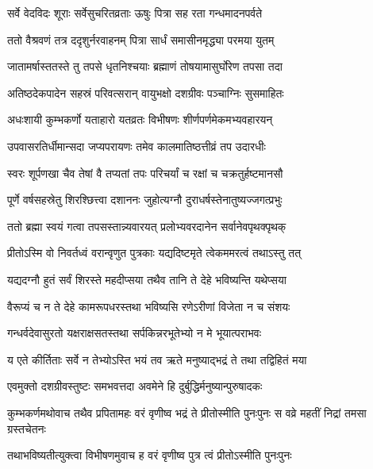 \twolineshloka
{सर्वे वेदविदः शूराः सर्वेसुचरितव्रताः}
{ऊषुः पित्रा सह रता गन्धमादनपर्वते}


\twolineshloka
{ततो वैश्रवणं तत्र ददृशुर्नरवाहनम्}
{पित्रा सार्धं समासीनमृद्ध्या परमया युतम्}


\twolineshloka
{जातामर्षास्ततस्ते तु तपसे धृतनिश्चयाः}
{ब्रह्माणं तोषयामासुर्घोरेण तपसा तदा}


\twolineshloka
{अतिष्ठदेकपादेन सहस्रं परिवत्सरान्}
{वायुभक्षो दशग्रीवः पञ्चाग्निः सुसमाहितः}


\twolineshloka
{अधःशायी कुम्भकर्णो यताहारो यतव्रतः}
{विभीषणः शीर्णपर्णमेकमभ्यवहारयन्}


\twolineshloka
{उपवासरतिर्धीमान्सदा जप्यपरायणः}
{तमेव कालमातिष्ठत्तीव्रं तप उदारधीः}


\twolineshloka
{स्वरः शूर्पणखा चैव तेषां वै तप्यतां तपः}
{परिचर्यां च रक्षां च चक्रतुर्हष्टमानसौ}


\twolineshloka
{पूर्णे वर्षसहस्रेतु शिरश्छित्त्वा दशाननः}
{जुहोत्यग्नौ दुराधर्षस्तेनातुष्यज्जगत्प्रभुः}


\twolineshloka
{ततो ब्रह्मा स्वयं गत्वा तपसस्तान्न्यवारयत्}
{प्रलोभ्यवरदानेन सर्वानेवपृथक्पृथक्}



\twolineshloka
{प्रीतोऽस्मि वो निवर्तध्वं वरान्वृणुत पुत्रकाः}
{यद्यदिष्टमृते त्वेकममरत्वं तथाऽस्तु तत्}


\twolineshloka
{यद्यदग्नौ हुतं सर्वं शिरस्ते महदीप्सया}
{तथैव तानि ते देहे भविष्यन्ति यथेप्सया}


\twolineshloka
{वैरूप्यं च न ते देहे कामरूपधरस्तथा}
{भविष्यसि रणेऽरीणां विजेता न च संशयः}



\twolineshloka
{गन्धर्वदेवासुरतो यक्षराक्षसतस्तथा}
{सर्पकिन्नरभूतेभ्यो न मे भूयात्पराभवः}



\twolineshloka
{य एते कीर्तिताः सर्वे न तेभ्योऽस्ति भयं तव}
{ऋते मनुष्याद्भद्रं ते तथा तद्विहितं मया}



\twolineshloka
{एवमुक्तो दशग्रीवस्तुष्टः समभवत्तदा}
{अवमेने हि दुर्बुद्धिर्मनुष्यान्पुरुषादकः}


\threelineshloka
{कुम्भकर्णमथोवाच तथैव प्रपितामहः}
{वरं वृणीष्व भद्रं ते प्रीतोस्मीति पुनःपुनः}
{स वव्रे महतीं निद्रां तमसा ग्रस्तचेतनः}


\twolineshloka
{तथाभविष्यतीत्युक्त्वा विभीषणमुवाच ह}
{वरं वृणीष्व पुत्र त्वं प्रीतोऽस्मीति पुनःपुनः}

